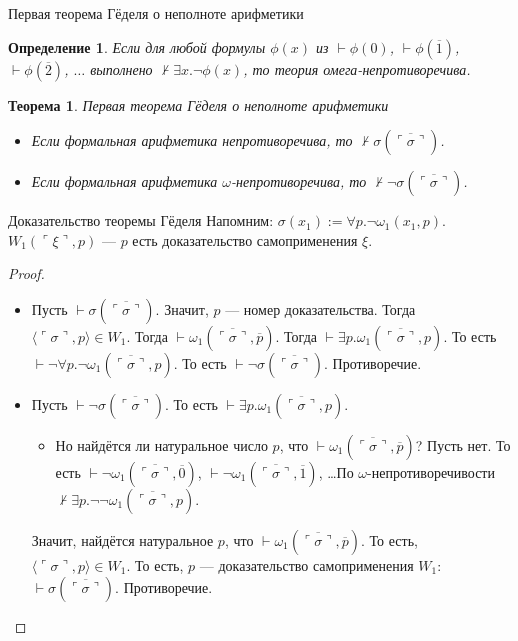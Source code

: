 \documentclass[aspectratio=169]{beamer}
\newtheorem{thm}{Теорема}[section]
\newtheorem{dfn}{Определение}[section]
\begin{document}
\begin{frame}{Первая теорема Гёделя о неполноте арифметики}
\begin{dfn}Если для любой формулы $\phi(x)$ из $\vdash\phi(0)$, $\vdash\phi(\overline{1})$,
$\vdash\phi(\overline{2})$, $\dots$ выполнено $\not\vdash\exists x.\neg\phi(x)$, 
то теория \emph{омега-непротиворечива}.
\end{dfn}

\begin{thm}{Первая теорема Гёделя о неполноте арифметики}
\begin{itemize}
\item Если формальная арифметика непротиворечива, то $\not\vdash\sigma(\overline{\ulcorner\sigma\urcorner})$.
\item Если формальная арифметика $\omega$-непротиворечива, то $\not\vdash\neg\sigma(\overline{\ulcorner\sigma\urcorner})$.
\end{itemize}
\end{thm}
\end{frame}

\begin{frame}{Доказательство теоремы Гёделя}
Напомним: $\sigma(x_1) := \forall p.\neg\omega_1(x_1,p)$. $W_1(\ulcorner\xi\urcorner,p)$ --- $p$ есть доказательство самоприменения $\xi$.
\begin{proof}
\begin{itemize}
\item Пусть $\vdash\sigma(\overline{\ulcorner\sigma\urcorner})$. Значит, $p$ --- номер доказательства. \pause Тогда
$\langle\ulcorner\sigma\urcorner,p\rangle \in W_1$. \pause Тогда $\vdash\omega_1(\overline{\ulcorner\sigma\urcorner},\overline{p})$. \pause 
Тогда $\vdash\exists p.\omega_1(\overline{\ulcorner\sigma\urcorner},p)$. \pause То есть
$\vdash\neg\forall p.\neg\omega_1(\overline{\ulcorner\sigma\urcorner},p)$. \pause То есть $\vdash\neg\sigma(\overline{\ulcorner\sigma\urcorner})$. Противоречие.
\pause
\item Пусть $\vdash\neg\sigma(\overline{\ulcorner\sigma\urcorner})$. \pause То есть $\vdash\exists p.\omega_1(\overline{\ulcorner\sigma\urcorner},p)$.
\begin{itemize}
\item
\pause Но найдётся ли натуральное число $p$, что $\vdash\omega_1(\overline{\ulcorner\sigma\urcorner},\overline{p})$?
\pause Пусть нет. То есть $\vdash\neg\omega_1(\overline{\ulcorner\sigma\urcorner},\overline{0})$,
                          $\vdash\neg\omega_1(\overline{\ulcorner\sigma\urcorner},\overline{1})$, 
                          \dots \pause По $\omega$-непротиворечивости $\not\vdash\exists p.\neg\neg\omega_1(\overline{\ulcorner\sigma\urcorner},p)$. \pause
\end{itemize}
       Значит, найдётся натуральное $p$, что $\vdash\omega_1(\overline{\ulcorner\sigma\urcorner},\overline{p})$. \pause 
То есть, $\langle\ulcorner\sigma\urcorner, p\rangle\in W_1$. \pause
То есть, $p$ --- доказательство самоприменения $W_1$: $\vdash\sigma(\overline{\ulcorner\sigma\urcorner})$. \pause Противоречие.
\end{itemize}
\end{proof}
\end{frame}
\end{document}
